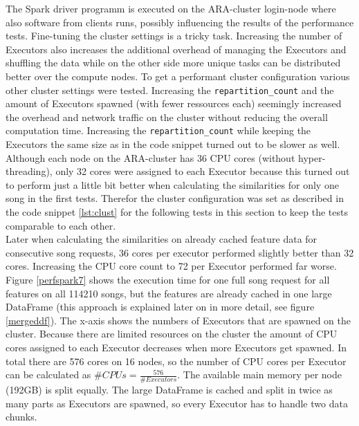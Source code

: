 \noindent The Spark driver programm is executed on the ARA-cluster login-node where also software from clients runs, possibly influencing the results of the performance tests. Fine-tuning the cluster settings is a tricky task. Increasing the number of Executors also increases the additional overhead of managing the Executors and shuffling the data while on the other side more unique tasks can be distributed better over the compute nodes. To get a performant cluster configuration various other cluster settings were tested. Increasing the \lstinline{repartition_count} and the amount of Executors spawned (with fewer ressources each) seemingly increased the overhead and network traffic on the cluster without reducing the overall computation time. Increasing the \lstinline{repartition_count} while keeping the Executors the same size as in the code snippet turned out to be slower as well.\\ 
Although each node on the ARA-cluster has 36 CPU cores (without hyper-threading), only 32 cores were assigned to each Executor because this turned out to perform just a little bit better when calculating the similarities for only one song in the first tests. Therefor the cluster configuration was set as described in the code snippet \ref{lst:clust} for the following tests in this section to keep the tests comparable to each other.\\
Later when calculating the similarities on already cached feature data for consecutive song requests, 36 cores per executor performed slightly better than 32 cores. Increasing the CPU core count to 72 per Executor performed far worse.\\ 
\noindent Figure \ref{perfspark7} shows the execution time for one full song request for all features on all 114210 songs, but the features are already cached in one large DataFrame (this approach is explained later on in more detail, see figure \ref{mergeddf}).
The x-axis shows the numbers of Executors that are spawned on the cluster. Because there are limited resources on the cluster the amount of CPU cores assigned to each Executor decreases when more Executors get spawned. In total there are 576 cores on 16 nodes, so the number of CPU cores per Executor can be calculated as $\#CPUs = \frac{576}{\#Executors}$. The available main memory per node (192GB) is split equally. The large DataFrame is cached and split in twice as many parts as Executors are spawned, so every Executor has to handle two data chunks.

